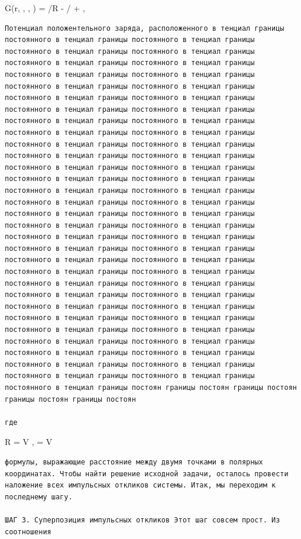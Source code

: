 \documentclass[
  ukrainian,
]{article}
\begin{document}
G(r, \theta, \rho, \phi) =  /R - 
/ +  \ln \rho,

\begin{verbatim}
Потенциал положентельного заряда, расположенного в тенциал границы постоянного в тенциал границы постоянного в тенциал границы постоянного в тенциал границы постоянного в тенциал границы постоянного в тенциал границы постоянного в тенциал границы постоянного в тенциал границы постоянного в тенциал границы постоянного в тенциал границы постоянного в тенциал границы постоянного в тенциал границы постоянного в тенциал границы постоянного в тенциал границы постоянного в тенциал границы постоянного в тенциал границы постоянного в тенциал границы постоянного в тенциал границы постоянного в тенциал границы постоянного в тенциал границы постоянного в тенциал границы постоянного в тенциал границы постоянного в тенциал границы постоянного в тенциал границы постоянного в тенциал границы постоянного в тенциал границы постоянного в тенциал границы постоянного в тенциал границы постоянного в тенциал границы постоянного в тенциал границы постоянного в тенциал границы постоянного в тенциал границы постоянного в тенциал границы постоянного в тенциал границы постоянного в тенциал границы постоянного в тенциал границы постоянного в тенциал границы постоянного в тенциал границы постоянного в тенциал границы постоянного в тенциал границы постоянного в тенциал границы постоянного в тенциал границы постоянного в тенциал границы постоянного в тенциал границы постоянного в тенциал границы постоянного в тенциал границы постоянного в тенциал границы постоянного в тенциал границы постоянного в тенциал границы постоянного в тенциал границы постоянного в тенциал границы постоянного в тенциал границы постоянного в тенциал границы постоянного в тенциал границы постоянного в тенциал границы постоянного в тенциал границы постоянного в тенциал границы постоянного в тенциал границы постоянного в тенциал границы постоянного в тенциал границы постоянного в тенциал границы постоянного в тенциал границы постоян границы постоян границы постоян границы постоян границы постоян

где
\end{verbatim}

R = V , 
= V

\begin{verbatim}
формулы, выражающие расстояние между двумя точками в полярных координатах. Чтобы найти решение исходной задачи, осталось провести наложение всех импульсных откликов системы. Итак, мы переходим к последнему шагу.

ШАГ 3. Суперпозиция импульсных откликов Этот шаг совсем прост. Из соотношения
\end{verbatim}
\end{document}
